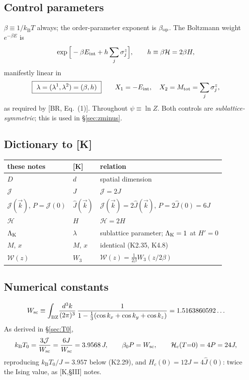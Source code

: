 \documentclass[11pt,a4paper]{article}
\newcommand{\Jc}{\mathcal{J}}
\newcommand{\Hc}{\mathcal{H}}
\newcommand{\Jh}{\hat J}
\newcommand{\kB}{k_{\mathrm B}}
\newcommand{\bk}{\vec k}
\newcommand{\dk}{\frac{d^3k}{(2\pi)^3}}
\newcommand{\Wc}{\mathcal{W}}
\newcommand{\LK}{\Lambda_{\rm K}}
\newcommand{\Jc}{\mathcal{J}}
\newcommand{\Hc}{\mathcal{H}}          %
\newcommand{\kB}{k_{\mathrm B}}
\newcommand{\bk}{\vec k}
\newcommand{\dk}{\frac{d^3k}{(2\pi)^3}}
\newcommand{\Wc}{\mathcal{W}}
\begin{document}
\subsection{Control parameters}
$\beta\equiv1/\kB T$ always; the order-parameter exponent is $\beta_{\rm op}$. The Boltzmann
weight $e^{-\beta E}$ is
\begin{equation}
  \exp\Big[-\beta E_{\rm int}+h\sum_j\sigma^z_j\Big],
  \qquad h\equiv\beta\Hc=2\beta H,
\end{equation}
manifestly linear in
\begin{equation}
  \boxed{\ \lambda=(\lambda^1,\lambda^2)=(\beta,h)\ }
  \qquad
  X_1=-E_{\rm int},\quad X_2=M_{\rm tot}=\sum_j\sigma^z_j ,
  \label{eq:controls}
\end{equation}
as required by [BR, Eq.~(1)]. Throughout $\psi\equiv\ln Z$. Both controls are
\emph{sublattice-symmetric}; this is used in \S\ref{sec:zminus}.

\subsection{Dictionary to [K]}
\label{sec:dict}
\begin{center}
\begin{tabular}{lll}
\hline
these notes & [K] & relation \\
\hline
$D$ & $d$ & spatial dimension \\
$\Jc$ & $J$ & $\Jc=2J$ \\
$\Jc(\bk)$, $P=\Jc(0)$ & $\Jh(\bk)$ & $\Jc(\bk)=2\Jh(\bk)$, $P=2\Jh(0)=6J$ \\
$\Hc$ & $H$ & $\Hc=2H$ \\
$\LK$ & $\lambda$ & sublattice parameter; $\LK=1$ at $H'=0$ \\
$M$, $x$ & $M$, $x$ & identical (K2.35, K4.8)\\
$\Wc(z)$ & $W_3$ & $\Wc(z)=\tfrac{1}{2\beta}W_3(z/2\beta)$\\
\hline
\end{tabular}
\end{center}

\subsection{Numerical constants}
\begin{equation}
  W_{\rm sc}\equiv\int_{\rm BZ}\!\dk\,\frac{1}{1-\tfrac13(\cos k_x+\cos k_y+\cos k_z)}
   =1.5163860592\ldots
\end{equation}
As derived in \S\ref{sec:T0},
\begin{equation}
  \kB T_0=\frac{3\Jc}{W_{\rm sc}}=\frac{6J}{W_{\rm sc}}=3.9568\,J,
  \qquad
  \beta_0 P=W_{\rm sc},
  \qquad
  \Hc_c(T{=}0)=4P=24J ,
\end{equation}
reproducing $\kB T_0/J=3.957$ below (K2.29), and $H_c(0)=12J=4\Jh(0)$: twice the Ising
value, as [K,\S III] notes.
\end{document}
